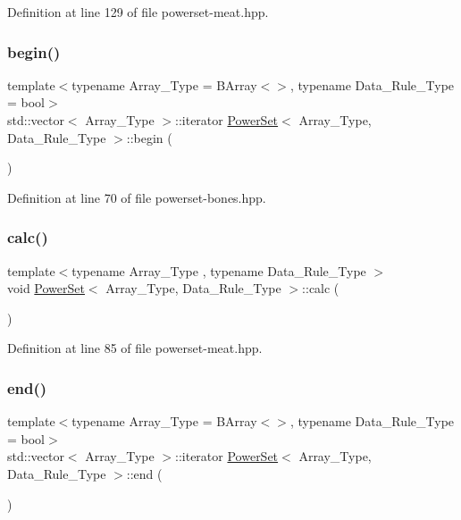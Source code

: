 Definition at line 129 of file powerset-\/meat.\+hpp.

\mbox{\label{class_power_set_abed9d58db924366d8a38baf168131fc3}} 
\subsubsection{\texorpdfstring{begin()}{begin()}}
{\footnotesize\ttfamily template$<$typename Array\+\_\+\+Type  = B\+Array$<$$>$, typename Data\+\_\+\+Rule\+\_\+\+Type  = bool$>$ \\
std\+::vector$<$ Array\+\_\+\+Type $>$\+::iterator \hyperlink{class_power_set}{Power\+Set}$<$ Array\+\_\+\+Type, Data\+\_\+\+Rule\+\_\+\+Type $>$\+::begin (\begin{DoxyParamCaption}{ }\end{DoxyParamCaption})\hspace{0.3cm}{\ttfamily [inline]}}



Definition at line 70 of file powerset-\/bones.\+hpp.

\mbox{\label{class_power_set_ad3b707294498105b2cc1a04017cc96d2}} 
\subsubsection{\texorpdfstring{calc()}{calc()}}
{\footnotesize\ttfamily template$<$typename Array\+\_\+\+Type , typename Data\+\_\+\+Rule\+\_\+\+Type $>$ \\
void \hyperlink{class_power_set}{Power\+Set}$<$ Array\+\_\+\+Type, Data\+\_\+\+Rule\+\_\+\+Type $>$\+::calc (\begin{DoxyParamCaption}{ }\end{DoxyParamCaption})\hspace{0.3cm}{\ttfamily [inline]}}



Definition at line 85 of file powerset-\/meat.\+hpp.

\mbox{\label{class_power_set_ac734ed684aa314b722a05d423c607a38}} 
\subsubsection{\texorpdfstring{end()}{end()}}
{\footnotesize\ttfamily template$<$typename Array\+\_\+\+Type  = B\+Array$<$$>$, typename Data\+\_\+\+Rule\+\_\+\+Type  = bool$>$ \\
std\+::vector$<$ Array\+\_\+\+Type $>$\+::iterator \hyperlink{class_power_set}{Power\+Set}$<$ Array\+\_\+\+Type, Data\+\_\+\+Rule\+\_\+\+Type $>$\+::end (\begin{DoxyParamCaption}{ }\end{DoxyParamCaption})\hspace{0.3cm}{\ttfamily [inline]}}



